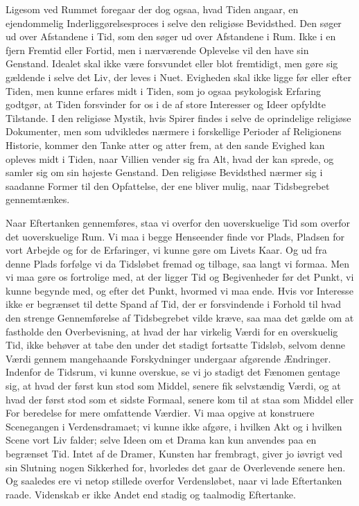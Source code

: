 \documentclass[12pt,a4paper]{article}
\newcommand{\opage}[1]{\marginnote{\footnotesize\textit{[#1]}}}
\begin{document}
Ligesom ved Rummet foregaar der dog ogsaa, hvad Tiden angaar, en
ejendommelig Inderliggørelsesproces i selve den religiøse Bevidsthed. Den
søger ud over Afstandene i Tid, som den søger ud over Afstandene i Rum. Ikke
i en fjern Fremtid eller Fortid, men i nærværende Oplevelse vil den have sin
Genstand. Idealet \opage{16} skal ikke være forsvundet eller blot fremtidigt, men gøre
sig gældende i selve det Liv, der leves i Nuet. Evigheden skal ikke ligge
før eller efter Tiden, men kunne erfares midt i Tiden, som jo ogsaa
psykologisk Erfaring godtgør, at Tiden forsvinder for os i de af store
Interesser og Ideer opfyldte Tilstande. I den religiøse Mystik, hvis Spirer
findes i selve de oprindelige religiøse Dokumenter, men som udvikledes
nærmere i forskellige Perioder af Religionens Historie, kommer den Tanke
atter og atter frem, at den sande Evighed kan opleves midt i Tiden, naar
Villien vender sig fra Alt, hvad der kan sprede, og samler sig om sin højeste
Genstand. Den religiøse Bevidsthed nærmer sig i saadanne Former til den
Opfattelse, der ene bliver mulig, naar Tidsbegrebet gennemtænkes.

Naar Eftertanken gennemføres, staa vi overfor den uoverskuelige Tid som
overfor det uoverskuelige Rum. Vi maa i begge Henseender finde vor Plads,
Pladsen for vort Arbejde og for de Erfaringer, vi kunne gøre om Livets Kaar.
Og ud fra denne Plads forfølge vi da Tidsløbet fremad og tilbage, saa langt
vi formaa. Men vi maa gøre os fortrolige med, at der ligger Tid og
Begivenheder før det Punkt, vi kunne begynde med, og efter det Punkt,
hvormed vi maa ende. Hvis vor Interesse ikke er begrænset til dette Spand af
Tid, der er forsvindende i Forhold til hvad den strenge Gennemførelse af
Tidsbegrebet vilde kræve, saa maa det gælde om at fastholde den
Overbevisning, at hvad der har virkelig Værdi for en overskuelig Tid, ikke
behøver at tabe den under det stadigt fortsatte Tidsløb, selvom denne Værdi
gennem mangehaande Forskydninger undergaar afgørende Ændringer. Indenfor de
Tidsrum, vi kunne overskue, se vi jo stadigt det Fænomen gentage sig, at
hvad der først kun stod som Middel, senere fik selvstændig Værdi, og at hvad
der først stod som et sidste Formaal, senere kom til at staa som Middel
eller For%
\opage{17}beredelse for mere omfattende Værdier. Vi maa opgive at konstruere
Scenegangen i Verdensdramaet; vi kunne ikke afgøre, i hvilken Akt og i
hvilken Scene vort Liv falder; selve Ideen om et Drama kan kun anvendes paa
en begrænset Tid. Intet af de Dramer, Kunsten har frembragt, giver jo
iøvrigt ved sin Slutning nogen Sikkerhed for, hvorledes det gaar de
Overlevende senere hen. Og saaledes ere vi netop stillede overfor
Verdensløbet, naar vi lade Eftertanken raade. Videnskab er ikke Andet end
stadig og taalmodig Eftertanke.
\end{document}
